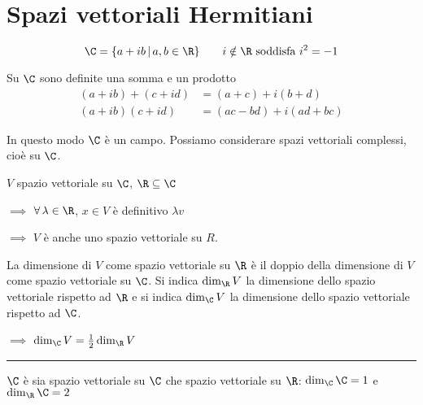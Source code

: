 

\section{Spazi vettoriali Hermitiani}

\[
    \C =\{a+ib\,|\, a, b \in \R\}\qquad i \notin \R\text{ soddisfa }i^{2}=-1
\]

Su $ \C $ sono definite una somma e un prodotto \begin{align*}
    (a+ib)+(c+id)&=(a+c)+i(b+d)\\
    (a+ib)(c+id)&=(ac-bd)+i(ad+bc)
\end{align*}

In questo modo $ \C $ è un campo. Possiamo considerare spazi vettoriali complessi, cioè su $ \C $.


$ V $ spazio vettoriale su $ \C $, $ \R \subseteq \C $ 

$\implies$ $ \forall\, \lambda \in \R $, $ x \in V $ è definitivo $ \lambda v $ 

$\implies$ $ V $ è anche uno spazio vettoriale su $ R $. 

La dimensione di $ V $ come spazio vettoriale su $ \R $ è il doppio della dimensione di $ V $ come spazio vettoriale su $ \C $. Si indica $ \dim_{\R} V $ la dimensione dello spazio vettoriale rispetto ad $ \R $ e si indica $ \dim_{\C} V $ la dimensione dello spazio vettoriale rispetto ad $ \C $. 

$\implies$ $ \dim_{\C} V = \frac{1}{2}\dim_{\R} V $

\rule{7em}{.4pt}

$ \C $ è sia spazio vettoriale su $ \C $ che spazio vettoriale su $ \R $: $ \dim_{\C} \C = 1 $ e $ \dim_{\R} \C = 2 $

